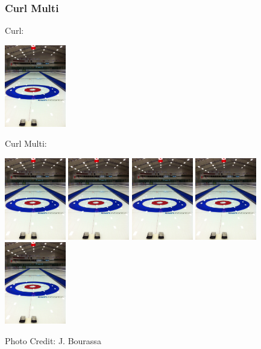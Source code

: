 \begin{frame}
\frametitle{Curl Multi}

Curl:
\begin{center}
	\includegraphics[width=0.2\textwidth]{images/curling.jpg}
\end{center}

Curl Multi:
\begin{center}
	\includegraphics[width=0.2\textwidth]{images/curling.jpg}
	\includegraphics[width=0.2\textwidth]{images/curling.jpg}
	\includegraphics[width=0.2\textwidth]{images/curling.jpg}
	\includegraphics[width=0.2\textwidth]{images/curling.jpg}
	\includegraphics[width=0.2\textwidth]{images/curling.jpg}
\end{center}

\hfill Photo Credit: J. Bourassa

\end{frame}


